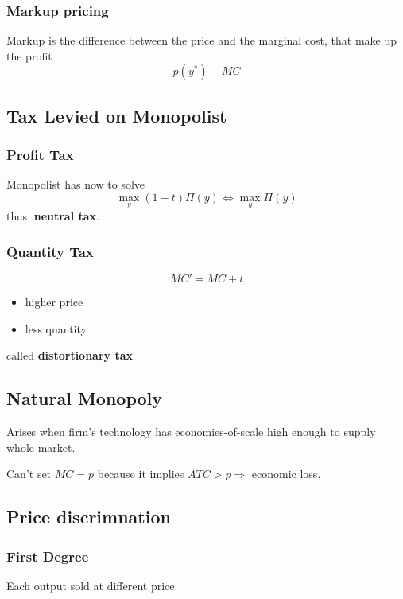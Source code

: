 \documentclass[a4paper] {scrartcl}
\begin{document}
\subsubsection{Markup pricing}
Markup is the difference between the price and the marginal cost, that make up the profit
\begin{equation}
	p(y^*) - MC
\end{equation}

\subsection{Tax Levied on Monopolist}
\subsubsection{Profit Tax}
Monopolist has now to solve
\begin{equation}
\max_y	(1-t)\Pi(y) \Leftrightarrow \max_y \Pi(y)
\end{equation}
thus, \textbf{neutral tax}.

\subsubsection{Quantity Tax}

\begin{equation}
	MC' = MC +t
\end{equation}
\begin{itemize}
	\item higher price
	\item less quantity
\end{itemize}

called \textbf{distortionary tax}


\subsection{Natural Monopoly}
Arises when firm's technology has economies-of-scale high enough to supply whole market.

Can't set $MC=p$ because it implies $ATC>p \Rightarrow$ economic loss.

\subsection{Price discrimnation}

\subsubsection{First Degree}
Each output sold at different price.
\end{document}
